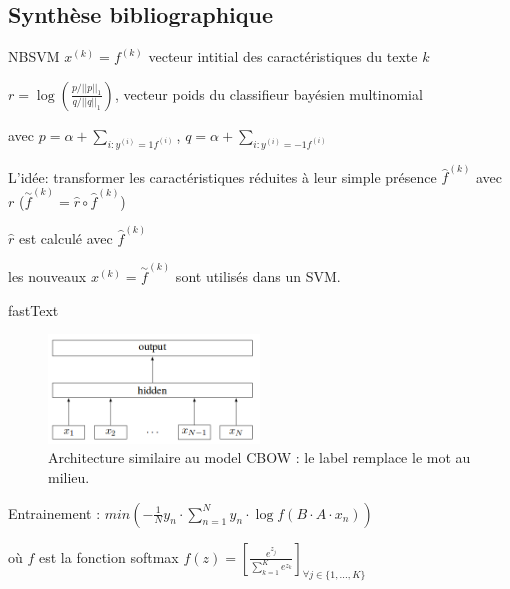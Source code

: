 \documentclass[newPxFont,pagenumber]{beamer}
\begin{document}
\subsection{Synthèse bibliographique}

\begin{frame}{NBSVM \cite{wang2012nbsvm}}
$x^{(k)} = f^{(k)}$ vecteur intitial des caractéristiques du texte $k$

$r = \log \left( \frac{p/\vert\vert p \vert\vert_1}{q / \vert\vert q \vert\vert_1}\right)$, vecteur poids du classifieur bayésien multinomial

avec $p=\alpha + \sum_{i:y^{(i)}=1f^{(i)}}$, $q=\alpha + \sum_{i:y^{(i)}=-1f^{(i)}}$

L'idée: transformer les caractéristiques réduites à leur simple présence $\widehat{f}^{(k)}$ avec $r$ ($\overset{\sim}{f}^{(k)} = \widehat{r} \circ \widehat{f}^{(k)}$)

$\widehat{r}$ est calculé avec $\widehat{f}^{(k)}$

les nouveaux $x^{(k)} = \overset{\sim}{f}^{(k)}$ sont utilisés dans un SVM.

\end{frame}

\begin{frame}{fastText \cite{grave2017fastText}}
\begin{figure}
\includegraphics[width=0.5\textwidth]{fastTextArchi.png}
\caption{\scriptsize Architecture similaire au model CBOW : le label remplace le mot au milieu.}
\end{figure}

Entrainement : $min \left(-\frac{1}{N}y_n \cdot \sum\limits_{n=1}^N y_n \cdot \log{f(B\cdot A\cdot x_n)}\right)$ 

où $f$ est la fonction softmax $f(z) = \left[ \frac{e^{z_j}}{\sum\limits_{k=1}^K e^{z_k}} \right]_{\forall j \in \lbrace 1, ..., K \rbrace} $
\end{frame}
\end{document}
